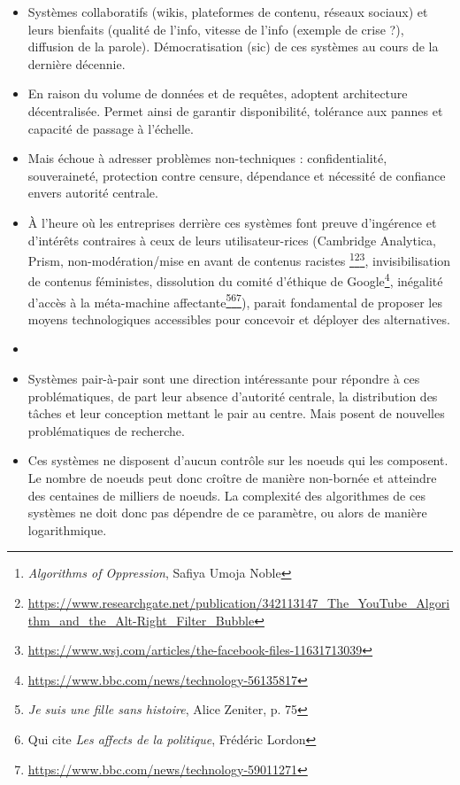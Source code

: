 \begin{itemize}
    \item Systèmes collaboratifs (wikis, plateformes de contenu, réseaux sociaux) et leurs bienfaits (qualité de l'info, vitesse de l'info (exemple de crise ?), diffusion de la parole).
      Démocratisation (sic) de ces systèmes au cours de la dernière décennie.
    \item En raison du volume de données et de requêtes, adoptent architecture décentralisée.
      Permet ainsi de garantir disponibilité, tolérance aux pannes et capacité de passage à l'échelle.
    \item Mais échoue à adresser problèmes non-techniques : confidentialité, souveraineté, protection contre censure, dépendance et nécessité de confiance envers autorité centrale.
    \item À l'heure où les entreprises derrière ces systèmes font preuve d'ingérence et d'intérêts contraires à ceux de leurs utilisateur-rices (Cambridge Analytica, Prism, non-modération/mise en avant de contenus racistes \footnote{\emph{Algorithms of Oppression}, Safiya Umoja Noble}\footnote{\url{https://www.researchgate.net/publication/342113147_The_YouTube_Algorithm_and_the_Alt-Right_Filter_Bubble}}\footnote{\url{https://www.wsj.com/articles/the-facebook-files-11631713039}}, invisibilisation de contenus féministes, dissolution du comité d'éthique de Google\footnote{\url{https://www.bbc.com/news/technology-56135817}}, inégalité d'accès à la méta-machine affectante\footnote{\emph{Je suis une fille sans histoire}, Alice Zeniter, p. 75}\footnote{Qui cite \emph{Les affects de la politique}, Frédéric Lordon}\footnote{\url{https://www.bbc.com/news/technology-59011271}}), parait fondamental de proposer les moyens technologiques accessibles pour concevoir et déployer des alternatives.
    \item {}
    \item Systèmes pair-à-pair sont une direction intéressante pour répondre à ces problématiques, de part leur absence d'autorité centrale, la distribution des tâches et leur conception mettant le pair au centre.
      Mais posent de nouvelles problématiques de recherche.
    \item Ces systèmes ne disposent d'aucun contrôle sur les noeuds qui les composent.
      Le nombre de noeuds peut donc croître de manière non-bornée et atteindre des centaines de milliers de noeuds.
      La complexité des algorithmes de ces systèmes ne doit donc pas dépendre de ce paramètre, ou alors de manière logarithmique.

\end{itemize}
